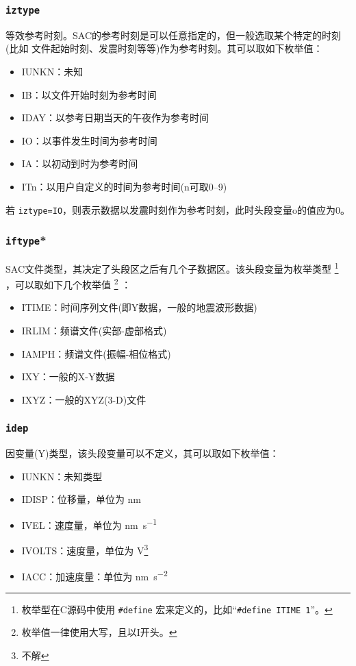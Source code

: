 \subsubsection{\texttt{iztype}}
等效参考时刻。SAC的参考时刻是可以任意指定的，但一般选取某个特定的时刻(比如
文件起始时刻、发震时刻等等)作为参考时刻。其可以取如下枚举值：
\begin{itemize}
\ttfamily
\item IUNKN：未知
\item IB：以文件开始时刻为参考时间
\item IDAY：以参考日期当天的午夜作为参考时间
\item IO：以事件发生时间为参考时间
\item IA：以初动到时为参考时间
\item ITn：以用户自定义的时间为参考时间(n可取0--9)
\end{itemize}

若 \texttt{iztype=IO}，则表示数据以发震时刻作为参考时刻，此时头段变量o的值应为0。

\subsubsection{\texttt{iftype}*}
SAC文件类型，其决定了头段区之后有几个子数据区。该头段变量为枚举类型
\footnote{枚举型在C源码中使用 \verb|#define| 宏来定义的，比如``\verb|#define ITIME 1|''。}
，可以取如下几个枚举值
\footnote{枚举值一律使用大写，且以I开头。} ：
\begin{itemize}
\ttfamily
\item ITIME：时间序列文件(即Y数据，一般的地震波形数据)
\item IRLIM：频谱文件(实部-虚部格式)
\item IAMPH：频谱文件(振幅-相位格式)
\item IXY：一般的X-Y数据
\item IXYZ：一般的XYZ(3-D)文件
\end{itemize}

\subsubsection{\texttt{idep}}
因变量(Y)类型，该头段变量可以不定义，其可以取如下枚举值：
\begin{itemize}
\ttfamily
\item IUNKN：未知类型
\item IDISP：位移量，单位为 \si{\nm}
\item IVEL：速度量，单位为 \si{\nm\per\s}
\item IVOLTS：速度量，单位为 \si{\V}\footnote{不解}
\item IACC：加速度量：单位为 \si{\nm\per\square\s}
\end{itemize}

